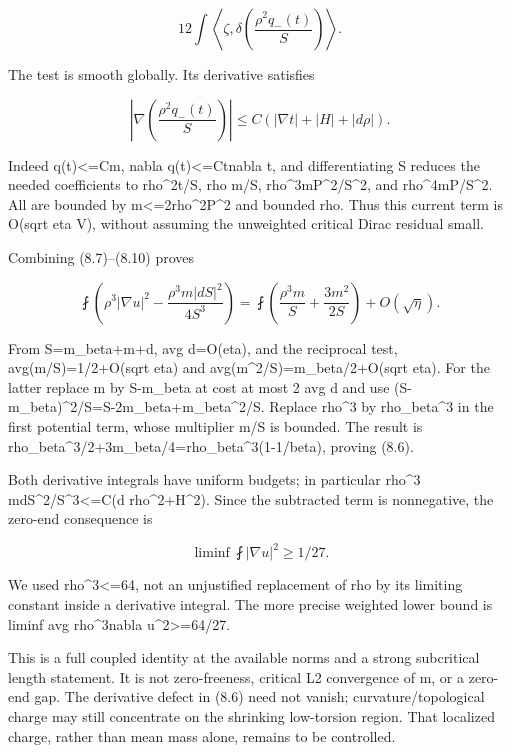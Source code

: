 \documentclass[
  10pt,
]{article}
\begin{document}
\[
       12\int\left\langle\zeta,
              \delta\left(\frac{\rho^2q_-(t)}S\right)\right\rangle.
\]

The test is smooth globally. Its derivative satisfies

\[
 \left|\nabla\left(\frac{\rho^2q_-(t)}S\right)\right|
       \le C(|\nabla t|+|H|+|d\rho|).                \tag{8.10}
\]

Indeed \textbar q(t)\textbar\textless=Cm, \textbar nabla
q(t)\textbar\textless=C\textbar t\textbar\textbar nabla t\textbar, and
differentiating S reduces the needed coefficients to
rho\^{}2\textbar t\textbar/S, rho m/S,
rho\^{}3m\textbar P\textbar\^{}2/S\^{}2, and
rho\^{}4m\textbar P\textbar/S\^{}2. All are bounded by
m\textless=2rho\^{}2\textbar P\textbar\^{}2 and bounded rho. Thus this
current term is O(sqrt eta V), without assuming the unweighted critical
Dirac residual small.

Combining (8.7)--(8.10) proves

\[
 \fint\left(\rho^3|\nabla u|^2-\frac{\rho^3m|dS|^2}{4S^3}\right)
  =\fint\left(\frac{\rho^3m}{S}+\frac{3m^2}{2S}\right)
      +O(\sqrt\eta).
\]

From S=m\_beta+m+d, avg d=O(eta), and the reciprocal test,
avg(m/S)=1/2+O(sqrt eta) and avg(m\^{}2/S)=m\_beta/2+O(sqrt eta). For
the latter replace m by S-m\_beta at cost at most 2 avg d and use
(S-m\_beta)\^{}2/S=S-2m\_beta+m\_beta\^{}2/S. Replace rho\^{}3 by
rho\_beta\^{}3 in the first potential term, whose multiplier m/S is
bounded. The result is
rho\_beta\^{}3/2+3m\_beta/4=rho\_beta\^{}3(1-1/beta), proving (8.6).

Both derivative integrals have uniform budgets; in particular rho\^{}3
m\textbar dS\textbar\^{}2/S\^{}3\textless=C(\textbar d
rho\textbar\^{}2+\textbar H\textbar\^{}2). Since the subtracted term is
nonnegative, the zero-end consequence is

\[
             \liminf\fint|\nabla u|^2\ge1/27.        \tag{8.11}
\]

We used rho\^{}3\textless=64, not an unjustified replacement of rho by
its limiting constant inside a derivative integral. The more precise
weighted lower bound is liminf avg rho\^{}3\textbar nabla
u\textbar\^{}2\textgreater=64/27.

This is a full coupled identity at the available norms and a strong
subcritical length statement. It is not zero-freeness, critical L2
convergence of m, or a zero-end gap. The derivative defect in (8.6) need
not vanish; curvature/topological charge may still concentrate on the
shrinking low-torsion region. That localized charge, rather than mean
mass alone, remains to be controlled.
\end{document}
